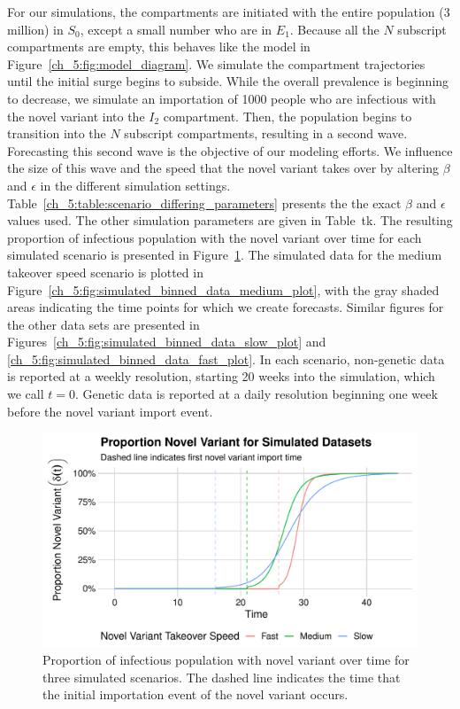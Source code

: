 For our simulations, the compartments are initiated with the entire population (3 million) in \( S_0 \), except a small number who are in \( E_1 \).
Because all the \( N \) subscript compartments are empty, this behaves like the model in Figure~\ref{ch_5:fig:model_diagram}.
We simulate the compartment trajectories until the initial surge begins to subside.
While the overall prevalence is beginning to decrease, we simulate an importation of 1000 people who are infectious with the novel variant into the \( I_2 \) compartment.
Then, the population begins to transition into the \( N \) subscript compartments, resulting in a second wave.
Forecasting this second wave is the objective of our modeling efforts.
We influence the size of this wave and the speed that the novel variant takes over by altering \( \beta \) and \( \epsilon \) in the different simulation settings.
Table~\ref{ch_5:table:scenario_differing_parameters} presents the  the exact \( \beta \) and \( \epsilon \) values used.
The other simulation parameters are given in Table~tk.
The resulting proportion of infectious population with the novel variant over time for each simulated scenario is presented in Figure~\ref{ch_5:fig:proportion_novel_variant_simulated_data_plot}.
The simulated data for the medium takeover speed scenario is plotted in Figure~\ref{ch_5:fig:simulated_binned_data_medium_plot}, with the gray shaded areas indicating the time points for which we create forecasts.
Similar figures for the other data sets are presented in Figures~\ref{ch_5:fig:simulated_binned_data_slow_plot} and \ref{ch_5:fig:simulated_binned_data_fast_plot}.
In each scenario, non-genetic data is reported at a weekly resolution, starting 20 weeks into the simulation, which we call \( t = 0 \).
Genetic data is reported at a daily resolution beginning one week before the novel variant import event.

\begin{figure}
    \centering
    \includegraphics[width=1.0\columnwidth]{proportion_novel_variant_simulated_data_plot}
    \caption{Proportion of infectious population with novel variant over time for three simulated scenarios.
    The dashed line indicates the time that the initial importation event of the novel variant occurs.}
    \label{ch_5:fig:proportion_novel_variant_simulated_data_plot}
\end{figure}

